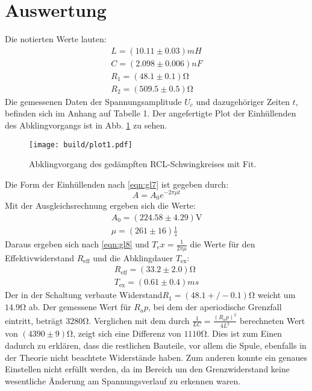 \section{Auswertung}
\label{sec:Auswertung}
Die notierten Werte lauten:
\begin{align}
L = (10.11 \pm 0.03) mH \\
C = (2.098 \pm 0.006) nF \\
R_1 = (48.1 \pm 0.1) \si{\ohm} \\
R_2 = (509.5 \pm 0.5) \si{\ohm} 
\end{align}
Die gemessenen Daten der Spannungsamplitude $U_c$ und dazugehöriger Zeiten $t$,
befinden sich im Anhang auf Tabelle 1.
Der angefertigte Plot der Einhüllenden des Abklingvorgangs ist in Abb. \ref{fig:plot1} zu sehen.
\begin{figure}
  \centering
  \texttt{[image: build/plot1.pdf]}
  \caption{Abklingvorgang des gedämpften RCL-Schwingkreises mit Fit.}
  \label{fig:plot1}
\end{figure}

Die Form der Einhüllenden nach \eqref{eqn:gl7} ist gegeben durch:
\begin{equation}
  A = A_0 e^{-2 \pi \mu t}
\end{equation}
Mit der Ausgleichsrechnung ergeben sich die Werte:
\begin{align}
  A_0 = (224.58 \pm 4.29) \si{\volt} \\
  \mu = (261 \pm 16) \frac{1}{s}
\end{align}
Daraus ergeben sich nach \eqref{eqn:gl8} und $T_ex = \frac{1}{2 \pi \mu}$ die Werte für den Effektivwiderstand $R_{\text{eff}}$ und die Abklingdauer $T_{\text{ex}}$:
\begin{align}
  R_{\text{eff}} = (33.2 \pm 2.0) \si{\ohm} \\
  T_{\text{ex}} = (0.61 \pm 0.4) ms
\end{align}
Der in der Schaltung verbaute Widerstand$R_1 = (48.1 +/- 0.1) \si{\ohm}$ weicht um $14.9 \si{\ohm}$ ab.
Der gemessene Wert für $R_ap$, bei dem der aperiodische Grenzfall eintritt, beträgt $3280 \si{\ohm}$.
Verglichen mit dem durch $\frac{1}{LC} = \frac{(R_ap)^2}{4L^2}$ berechneten Wert von $(4390 \pm 9) \si{\ohm}$, zeigt sich eine Differenz von $1110 \si{\ohm}$.
Dies ist zum Einen dadurch zu erklären, dass die restlichen Bauteile, vor allem die Spule, ebenfalls in der Theorie nicht beachtete Widerstände haben.
Zum anderen konnte ein genaues Einstellen nicht erfüllt werden, da im Bereich um den Grenzwiderstand keine wesentliche Änderung am Spannungsverlauf zu erkennen waren.

